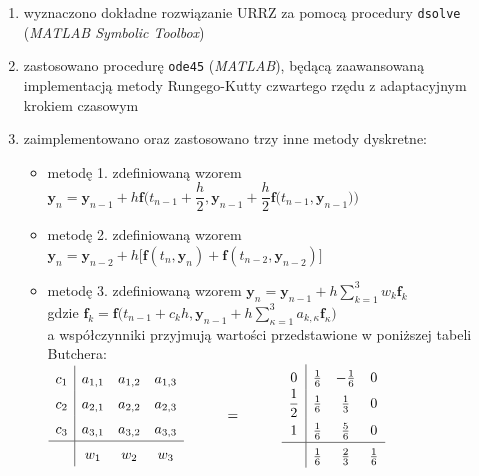 \documentclass[a4paper, 12pt, twoside, openany]{article}
\newcommand{\y}{\mathbf{y}}
\begin{document}
    \begin{enumerate}
        \item wyznaczono dokładne rozwiązanie URRZ za pomocą procedury \texttt{dsolve} (\textit{MATLAB Symbolic Toolbox})
        \item zastosowano procedurę \texttt{ode45} (\textit{MATLAB}), będącą zaawansowaną implementacją metody Rungego-Kutty czwartego rzędu z adaptacyjnym krokiem czasowym
        \item zaimplementowano oraz zastosowano trzy inne metody dyskretne:
        \begin{itemize}[label=\scriptsize$\bullet$]
            \item metodę 1. zdefiniowaną wzorem
            $\y_n = \y_{n-1} + h\mathbf{f}\bigg(t_{n-1} + \dfrac{h}{2},\y_{n-1} + \dfrac{h}{2}\mathbf{f}\big(t_{n-1},\y_{n-1}\big)\bigg)$
            \item metodę 2. zdefiniowaną wzorem
            $ \y_n = \y_{n-2} + h\Big[\mathbf{f}\left(t_{n},\y_{n}\right) + \mathbf{f}\left(t_{n-2},\y_{n-2}\right)\Big]$
            \item metodę 3. zdefiniowaną wzorem
            $\y_n = \y_{n-1} + h\sum\limits_{k=1}^{3}w_k\mathbf{f}_k$
            \\gdzie
            $\mathbf{f}_k = \mathbf{f}\bigg(t_{n-1}+c_kh,\y_{n-1} + h\sum\limits_{\kappa=1}^{3}a_{k,\kappa}\mathbf{f}_\kappa\bigg)$
            \\[0.5em] a współczynniki przyjmują wartości przedstawione w poniższej tabeli Butchera: \\[0.5em]
            $\arraycolsep=5pt\def\arraystretch{1.5}
            \begin{array}{c|ccc}
                c_1 & a_{1,1} & a_{1,2} & a_{1,3} \\
                c_2 & a_{2,1} & a_{2,2} & a_{2,3} \\
                c_3 & a_{3,1} & a_{3,2} & a_{3,3} \\
                \hline
                    & w_1 & w_2 & w_3
            \end{array}
            \hspace{1cm} = \hspace{1cm}
            \begin{array}{c|ccc}
                0            & \frac{1}{6} & -\frac{1}{6} & 0 \\
                \dfrac{1}{2} & \frac{1}{6} & \frac{1}{3} & 0 \\
                1            & \frac{1}{6} & \frac{5}{6} & 0 \\
                \hline
                & \frac{1}{6} & \frac{2}{3} & \frac{1}{6}
            \end{array} $
        \end{itemize}
    \end{enumerate}
\end{document}
